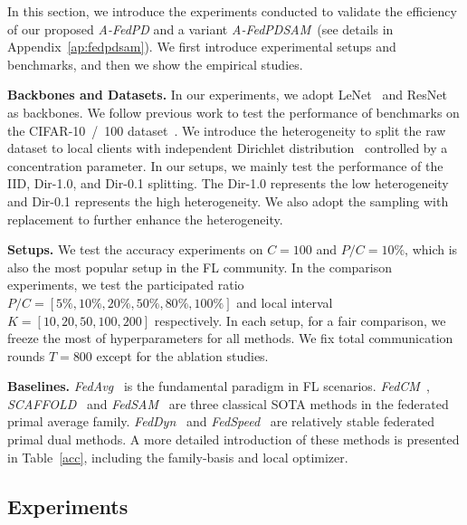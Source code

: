 In this section, we introduce the experiments conducted to validate the efficiency of our proposed \textit{A-FedPD} and a variant \textit{A-FedPDSAM}~(see details in Appendix~\ref{ap:fedpdsam}). We first introduce experimental setups and benchmarks, and then we show the empirical studies. 


\textbf{Backbones and Datasets.} In our experiments, we adopt LeNet~\cite{lecun1998gradient} and ResNet~\cite{he2016deep} as backbones. We follow previous work to test the performance of benchmarks on the CIFAR-10\ /\ 100 dataset~\cite{krizhevsky2009learning}. We introduce the heterogeneity to split the raw dataset to local clients with independent Dirichlet distribution~\cite{hsu2019measuring} controlled by a concentration parameter. In our setups, we mainly test the performance of the IID, Dir-1.0, and Dir-0.1 splitting. The Dir-1.0 represents the low heterogeneity and Dir-0.1 represents the high heterogeneity. We also adopt the sampling with replacement to further enhance the heterogeneity.

\textbf{Setups.} We test the accuracy experiments on $C=100$ and $P/C=10\%$, which is also the most popular setup in the FL community. In the comparison experiments, we test the participated ratio $P/C=\left[5\%,10\%,20\%,50\%,80\%,100\%\right]$ and local interval $K=\left[10,20,50,100,200\right]$ respectively. In each setup, for a fair comparison, we freeze the most of hyperparameters for all methods. We fix total communication rounds $T=800$ except for the ablation studies.

\textbf{Baselines.} \textit{FedAvg}~\citep{mcmahan2017communication} is the fundamental paradigm in FL scenarios. \textit{FedCM}~\citep{xu2021fedcm}, \textit{SCAFFOLD}~\citep{karimireddy2020scaffold} and \textit{FedSAM}~\citep{qu2022generalized} are three classical SOTA methods in the federated primal average family. \textit{FedDyn}~\citep{durmus2021federated} and \textit{FedSpeed}~\cite{sun2023fedspeed} are relatively stable federated primal dual methods. A more detailed introduction of these methods is presented in Table~\ref{acc}, including the family-basis and local optimizer.

\subsection{Experiments}
\label{experiments}

